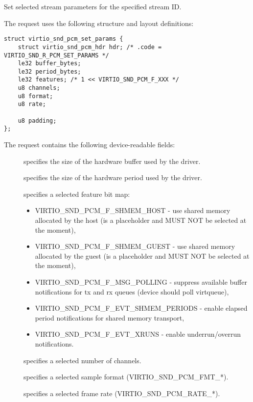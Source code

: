 Set selected stream parameters for the specified stream ID.

The request uses the following structure and layout definitions:

\begin{lstlisting}
struct virtio_snd_pcm_set_params {
    struct virtio_snd_pcm_hdr hdr; /* .code = VIRTIO_SND_R_PCM_SET_PARAMS */
    le32 buffer_bytes;
    le32 period_bytes;
    le32 features; /* 1 << VIRTIO_SND_PCM_F_XXX */
    u8 channels;
    u8 format;
    u8 rate;

    u8 padding;
};
\end{lstlisting}

The request contains the following device-readable fields:

\begin{description}
\item[] specifies the size of the hardware buffer used by
the driver.
\item[] specifies the size of the hardware period used by
the driver.
\item[] specifies a selected feature bit map:
\begin{itemize}
\item VIRTIO_SND_PCM_F_SHMEM_HOST - use shared memory allocated by the host
(is a placeholder and MUST NOT be selected at the moment),
\item VIRTIO_SND_PCM_F_SHMEM_GUEST - use shared memory allocated by the guest
(is a placeholder and MUST NOT be selected at the moment),
\item VIRTIO_SND_PCM_F_MSG_POLLING - suppress available buffer notifications
for tx and rx queues (device should poll virtqueue),
\item VIRTIO_SND_PCM_F_EVT_SHMEM_PERIODS - enable elapsed period notifications
for shared memory transport,
\item VIRTIO_SND_PCM_F_EVT_XRUNS - enable underrun/overrun notifications.
\end{itemize}
\item[] specifies a selected number of channels.
\item[] specifies a selected sample format (VIRTIO_SND_PCM_FMT_*).
\item[] specifies a selected frame rate (VIRTIO_SND_PCM_RATE_*).
\end{description}


